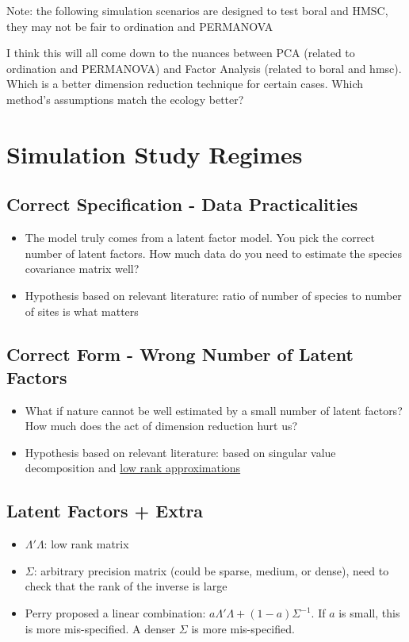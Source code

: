 \documentclass[12pt]{amsart}
\begin{document}
Note: the following simulation scenarios are designed to test boral and HMSC, they may not be fair to ordination and PERMANOVA

I think this will all come down to the nuances between PCA (related to ordination and PERMANOVA) and Factor Analysis (related to boral and hmsc). Which is a better dimension reduction technique for certain cases. Which method's assumptions match the ecology better?



\section{Simulation Study Regimes}
\subsection{Correct Specification - Data Practicalities}

\begin{itemize}
\item The model truly comes from a latent factor model. You pick the correct number of latent factors. How much data do you need to estimate the species covariance matrix well?

\item Hypothesis based on relevant literature: ratio of number of species to number of sites is what matters
\end{itemize}
\subsection{Correct Form - Wrong Number of Latent Factors}


\begin{itemize}
\item What if nature cannot be well estimated by a small number of latent factors? How much does the act of dimension reduction hurt us? 

\item Hypothesis based on relevant literature: based on singular value decomposition and \href{https://en.wikipedia.org/wiki/Singular_value_decomposition#Low-rank_matrix_approximation}{low rank approximations}
\end{itemize}
\subsection{Latent Factors + Extra}

\begin{itemize}
\item $\Lambda' \Lambda$: low rank matrix

\item $\Sigma$: arbitrary precision matrix (could be sparse, medium, or dense), need to check that the rank of the inverse is large

\item Perry proposed a linear combination: $a\Lambda' \Lambda + (1-a)\Sigma^{-1}$. If $a$ is small, this is more mis-specified. A denser $\Sigma$ is more mis-specified. 

\end{itemize}
\end{document}
